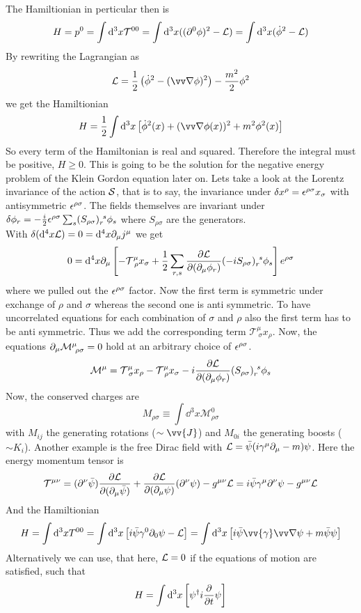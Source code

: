 The Hamiltionian in perticular then is
\[ H = p ^0 = \int {\rm d}^3 x \mathcal{T}^{00} = \int {\rm d}^3 x ( (\partial^0 \phi)^2 - \mathcal{L} ) = \int {\rm d}^3 x ( \dot{\phi}^2 - \mathcal{L})\]
By rewriting the Lagrangian as
\[ \LL = \frac{1}{2} \left( \dot{\phi}^2 - ( \vn \phi)^2 \right) - \frac{m^2}{2} \phi^2\]
we get the Hamiltionian
\[ H = \frac{1}{2} \int \dd ^3 x \left[ \dot{\phi}^2(x) + ( \vn \phi(x))^2 + m^2 \phi^2(x) \right]\]
So every term of the Hamiltonian is real and squared. Therefore the integral must be positive, $H \geq 0$. This is going to be the solution for the negative energy problem of the Klein Gordon equation later on.
Lets take a look at the Lorentz invariance of the action $\mathcal{S}$, that is to say, the invariance under $ \delta x^\rho = \epsilon^{\rho \sigma}x_\sigma$ with antisymmetric $\epsilon^{\rho\sigma}$. The fields themselves are invariant under $\delta \phi_r = - \frac{i}{2} \epsilon^{\rho \sigma} \sum_s (S_{\rho\sigma})_r^{~s}\phi_s$ where $S_{\rho\sigma}$ are the generators.\\
With $\delta({\rm d}^4 x \mathcal{L}) = 0 = {\rm d}^4 x \partial_\mu j^\mu$ we get
\[ 0 = {\rm d}^4 x \partial_\mu \left[ - \mathcal{T}^\mu_{~\rho} x_\sigma + \frac{1}{2} \sum_{r,s} \frac{\partial \mathcal{L}}{\partial( \partial_\mu \phi_r)} (-i S_{\rho \sigma})_r^{~s}\phi_s\right] e^{\rho \sigma}\]
where we pulled out the $\epsilon^{\rho\sigma}$ factor. Now the first term is symmetric under exchange of $\rho$ and $\sigma$ whereas the second one is anti symmetric. To have uncorrelated equations for each combination of $\sigma$ and $\rho$ also the first term has to be anti symmetric. Thus we add the corresponding term $\mathcal{T}^{\mu}_{~\sigma}x_\rho$. Now, the equations $\partial_\mu \mathcal{M}^\mu_{~\rho\sigma} =0$ hold at an arbitrary choice of $\epsilon^{\rho\sigma}$.
\[\mathcal{M}^\mu = \mathcal{T}^\mu_{~\sigma} x_\rho - \mathcal{T}^\mu_{~\rho}x_\sigma - i \frac{\partial \mathcal{L}}{\partial ( \partial _\mu \phi_r)} ( S_{\rho\sigma})_r^{~s}\phi_s\]
Now, the conserved charges are
\[ M_{\rho \sigma} \equiv \int \dd^3 x \mathcal{M}^0_{\rho\sigma}\]
with $M_{ij}$ the generating rotations ($\sim \vv{J}$) and $M_{0i}$ the generating boosts ($\sim K_i$).
Another example is the free Dirac field with $\mathcal{L} = \bar{\psi}( i \gamma^\mu \partial_ \mu - m ) \psi$. Here the energy momentum tensor is
\[ \mathcal{T}^{\mu \nu} = (\partial^\nu \bar{\psi}) \frac{\partial \mathcal{L}}{\partial ( \partial_\mu \bar{\psi})} + \frac{\partial \mathcal{L}}{\partial ( \partial_\mu \psi)} ( \partial^\nu \psi) - g^{\mu\nu} \mathcal{L} = i \bar{\psi} \gamma^\mu \partial ^\nu \psi - g^{\mu\nu} \mathcal{L}\]
And the Hamiltionian
\[ H = \int \dd^3 x T^{00} = \int \dd^3 x \left[ i \bar{\psi} \gamma^0 \p_0 \psi - \LL\right] = \int \dd^3 x \left[ i \bar{\psi}\vv{\gamma} \vn \psi + m \bar{\psi} \psi \right]\]
Alternatively we can use, that here, $\mathcal{L} = 0$ if the equations of motion are satisfied, such that 
\[ H = \int {\rm d}^3 x \left[ \psi^\dagger i \frac{\partial}{\partial t} \psi \right]\]
